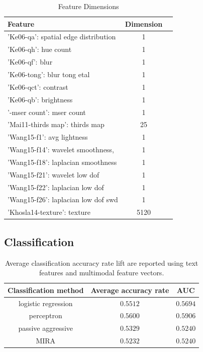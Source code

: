 \documentclass[conference,a4paper]{IEEEtran}
\begin{document}
\begin{table}
\begin{center}
\begin{tabular}{| l | c | c |}
\hline
Feature & Dimension \\ \hline
'Ke06-qa': spatial edge distribution & 1 \\ \hline
'Ke06-qh': hue count & 1 \\ \hline
'Ke06-qf': blur & 1 \\ \hline
'Ke06-tong': blur tong etal & 1 \\ \hline
'Ke06-qct': contrast & 1 \\ \hline
'Ke06-qb': brightness & 1 \\ \hline
'-mser count': mser count & 1 \\ \hline
'Mai11-thirds map': thirds map & 25 \\ \hline
'Wang15-f1': avg lightness & 1 \\ \hline
'Wang15-f14': wavelet smoothness, & 1 \\ \hline
'Wang15-f18': laplacian smoothness & 1 \\ \hline
'Wang15-f21': wavelet low dof & 1 \\ \hline
'Wang15-f22': laplacian low dof & 1 \\ \hline
'Wang15-f26': laplacian low dof swd & 1 \\ \hline
'Khosla14-texture': texture & 5120 \\ \hline
\hline
\end{tabular}
\end{center}
\caption{Feature Dimensions}
\end{table}

\subsection{Classification}
\label{sec:classification}
\begin{table}[h!]
   \label{tab:classification accuracy}
    \begin{center}
\begin{tabular}{|c||c|c|} 
\hline
Classification method&Average accuracy rate& AUC\\
\hline
 \hline
logistic regression& $0.5512$ & $0.5694$\\ \hline
perceptron&$\mathbf{0.5600}$&$\mathbf{0.5906}$\\ \hline
passive aggressive&$0.5329$& $0.5240$\\ \hline
MIRA&$0.5232$&$0.5240$\\ \hline
 \hline
 \end{tabular}
   \end{center}
\caption{Average classification accuracy rate lift are reported
     using text features and multimodal feature vectors.}
  \label{tab:classification accuracy}
\end{table}
\end{document}
